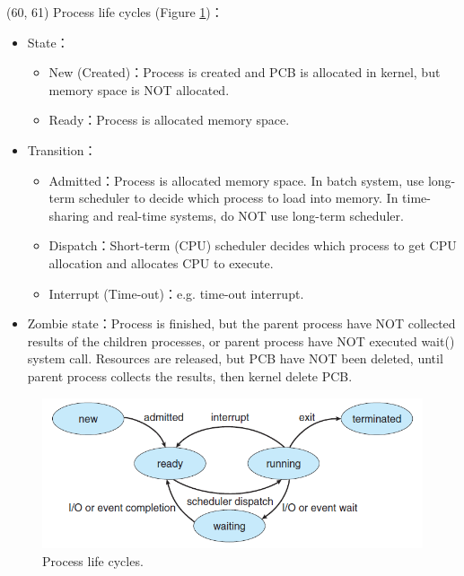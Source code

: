 \begin{theorem}{(60, 61)} Process life cycles (Figure \ref{img:process_lifecycles})： \begin{itemize}
        \item State：\begin{itemize}
            \item New (Created)：Process is created and PCB is allocated in kernel, but memory space is NOT allocated.
            \item Ready：Process is allocated memory space.
        \end{itemize}
        \item Transition：\begin{itemize}
            \item Admitted：Process is allocated memory space. In batch system, use long-term scheduler to decide which process to load into memory. In time-sharing and real-time systems, do NOT use long-term scheduler.
            \item Dispatch：Short-term (CPU) scheduler decides which process to get CPU allocation and allocates CPU to execute.
            \item Interrupt (Time-out)：e.g. time-out interrupt.
        \end{itemize}
        \item Zombie state：Process is finished, but the parent process have NOT collected results of the children processes, or parent process have NOT executed wait() system call. Resources are released, but PCB have NOT been deleted, until parent process collects the results, then kernel delete PCB.
    \end{itemize}
\end{theorem}

\begin{figure}[H]
    \centering
    \includegraphics[scale=0.8]{img/process_lifecycles.png}
    \caption{Process life cycles.}
    \label{img:process_lifecycles}
\end{figure}

